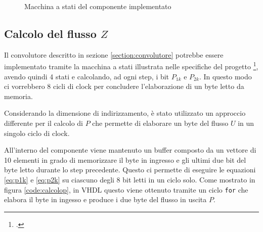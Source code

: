 \begin{figure}[!ht]
    \centering
    \caption{Macchina a stati del componente implementato}
    \label{fig:statemachine}
\end{figure}

\subsection{Calcolo del flusso \texorpdfstring{$Z$}{}}
\label{section:calcolodiz}

Il convolutore descritto in sezione \ref{section:convolutore} potrebbe essere implementato tramite la macchina a stati illustrata nelle specifiche del progetto \footcite{specifichedelprogetto}, avendo quindi 4 stati e calcolando, ad ogni step, i bit $P_{1k}$ e $P_{2k}$. In questo modo ci vorrebbero 8 cicli di clock per concludere l'elaborazione di un byte letto da memoria.

Considerando la dimensione di indirizzamento, è stato utilizzato un approccio differente per il calcolo di $P$ che permette di elaborare un byte del flusso $U$ in un singolo ciclo di clock.

All'interno del componente viene mantenuto un buffer composto da un vettore di 10 elementi in grado di memorizzare il byte in ingresso e gli ultimi due bit del byte letto durante lo step precedente. Questo ci permette di eseguire le equazioni \ref{eq:p1k} e \ref{eq:p2k} su ciascuno degli 8 bit letti in un ciclo solo. Come mostrato in figura \ref{code:calcolop}, in VHDL questo viene ottenuto tramite un ciclo \verb|for| che elabora il byte in ingesso e produce i due byte del flusso in uscita $P$.

